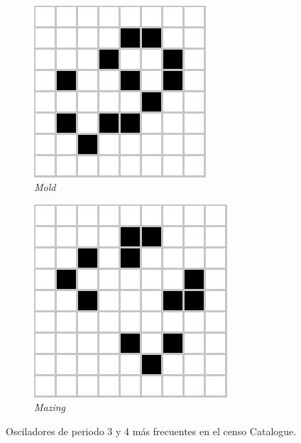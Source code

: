 \documentclass[../proyecto.tex]{memoir}
\begin{document}
\begin{figure}[H]
\begin{subfigure}[b]{0.3\linewidth}
    \end{subfigure}
    \\
	\begin{subfigure}[b]{0.3\linewidth} 
        \centering
        \includegraphics[height=0.65\linewidth]{./images/mold.png}
        \caption{\textit{Mold}}
        \label{fig:mold}
    \end{subfigure}
    \quad
	\begin{subfigure}[b]{0.3\linewidth} 
        \centering
        \includegraphics[height=0.65\linewidth]{./images/mazing.png}
        \caption{\textit{Mazing}}
        \label{fig:mazing}
    \end{subfigure}
	\caption{Osciladores de periodo 3 y 4 más frecuentes en el censo {Catalogue}.}
	\label{fig:toposciladores}
\end{figure} 
\end{document}
